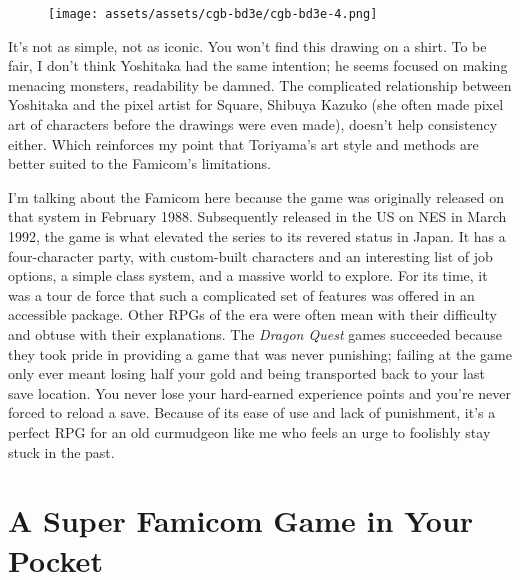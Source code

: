 \documentclass{book}
\begin{document}
\begin{figure}[hbt]
\vskip 10pt
\centering \texttt{[image: assets/assets/cgb-bd3e/cgb-bd3e-4.png]}
\vskip 6pt
\end{figure}

It’s not as simple, not as iconic. You won’t find this drawing on a shirt. To be fair, I don’t think Yoshitaka had the same intention; he seems focused on making menacing monsters, readability be damned. The complicated relationship between Yoshitaka and the pixel artist for Square, Shibuya Kazuko (she often made pixel art of characters before the drawings were even made), doesn’t help consistency either. Which reinforces my point that Toriyama’s art style and methods are better suited to the Famicom’s limitations.

I’m talking about the Famicom here because the game was originally released on that system in February 1988. Subsequently released in the US on NES in March 1992, the game is what elevated the series to its revered status in Japan. It has a four-character party, with custom-built characters and an interesting list of job options, a simple class system, and a massive world to explore. For its time, it was a tour de force that such a complicated set of features was offered in an accessible package. Other RPGs of the era were often mean with their difficulty and obtuse with their explanations. The \emph{Dragon Quest} games succeeded because they took pride in providing a game that was never punishing; failing at the game only ever meant losing half your gold and being transported back to your last save location. You never lose your hard-earned experience points and you’re never forced to reload a save. Because of its ease of use and lack of punishment, it’s a perfect RPG for an old curmudgeon like me who feels an urge to foolishly stay stuck in the past.

\FloatBarrier\needspace{10mm}\section*{A Super Famicom Game in Your Pocket}\nopagebreak[4]
\end{document}

